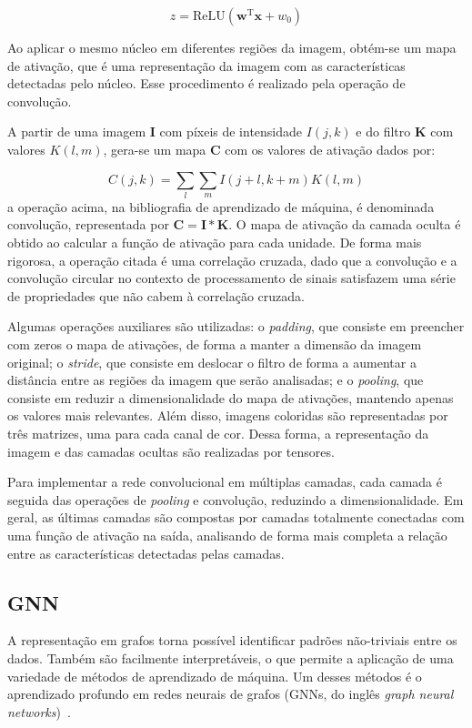 \begin{equation}
    z = \text{ReLU}(\mathbf{w}^\text{T} \mathbf{x} + w_0)
\end{equation}

Ao aplicar o mesmo núcleo em diferentes regiões da imagem, obtém-se um mapa de
ativação, que é uma representação da imagem com as características detectadas
pelo núcleo. Esse procedimento é realizado pela operação de convolução.

A partir de uma imagem $\mathbf{I}$ com píxeis de intensidade $I(j, k)$
e do filtro $\mathbf{K}$ com valores $K(l, m)$, gera-se um mapa $\mathbf{C}$ com
os valores de ativação dados por:

\begin{equation}
    C(j, k) = \sum_{l} \sum_{m} I(j+l, k+m)K(l, m)
\end{equation}
a operação acima, na bibliografia de aprendizado de máquina, é denominada
convolução, representada por $\mathbf{C} = \mathbf{I} * \mathbf{K}$. O mapa de
ativação da camada oculta é obtido ao calcular a função de ativação para cada
unidade. De forma mais rigorosa, a operação citada é uma correlação cruzada, dado
que a convolução e a convolução circular no contexto de processamento de sinais
satisfazem uma série de propriedades que não cabem à correlação cruzada.

Algumas operações auxiliares são utilizadas: o \textit{padding}, que consiste em
preencher com zeros o mapa de ativações, de forma a manter a dimensão da imagem
original; o \textit{stride}, que consiste em deslocar o filtro de forma a
aumentar a distância entre as regiões da imagem que serão analisadas; e o
\textit{pooling}, que consiste em reduzir a dimensionalidade do mapa de
ativações, mantendo apenas os valores mais relevantes. Além disso, imagens
coloridas são representadas por três matrizes, uma para cada canal de cor. Dessa
forma, a representação da imagem e das camadas ocultas são realizadas por
tensores.

Para implementar a rede convolucional em múltiplas camadas, cada camada é
seguida das operações de \textit{pooling} e convolução, reduzindo a
dimensionalidade. Em geral, as últimas camadas são compostas por camadas
totalmente conectadas com uma função de ativação na saída, analisando de forma
mais completa a relação entre as características detectadas pelas camadas.

\subsection{GNN}
A representação em grafos torna possível identificar padrões
não-triviais entre os dados. Também são facilmente interpretáveis, o que
permite a aplicação de uma variedade de métodos de aprendizado de máquina. Um
desses métodos é o aprendizado profundo em redes neurais de grafos (GNNs, do
inglês \textit{graph neural networks})~\cite{Bishop:DeepLearning24}.



